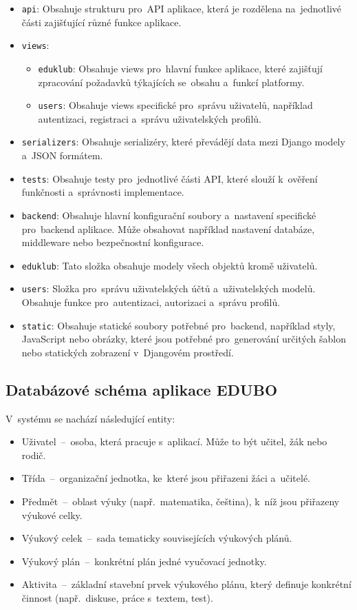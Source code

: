 \documentclass[male,czech,api_bc]{kitheses}
\begin{document}
\begin{itemize}
	\item \texttt{api}: Obsahuje strukturu pro~API aplikace, která je rozdělena na~jednotlivé části zajišťující různé funkce aplikace.
	\item \texttt{views}:
	\begin{itemize}
		\item \texttt{eduklub}: Obsahuje views pro~hlavní funkce aplikace, které zajišťují zpracování požadavků týkajících se~obsahu a~funkcí platformy.
		\item \texttt{users}: Obsahuje views specifické pro~správu uživatelů, například autentizaci, registraci a~správu uživatelských profilů.
	\end{itemize}
	\item \texttt{serializers}: Obsahuje serializéry, které převádějí data mezi Django modely a~JSON formátem.
	\item \texttt{tests}: Obsahuje testy pro~jednotlivé části API, které slouží k~ověření funkčnosti a~správnosti implementace.
	\item \texttt{backend}: Obsahuje hlavní konfigurační soubory a~nastavení specifické pro~backend aplikace. Může obsahovat například nastavení databáze, middleware nebo bezpečnostní konfigurace.
	\item \texttt{eduklub}: Tato složka obsahuje modely všech objektů kromě uživatelů.
	\item \texttt{users}: Složka pro~správu uživatelských účtů a~uživatelských modelů. Obsahuje funkce pro~autentizaci, autorizaci a~správu profilů.
	\item \texttt{static}: Obsahuje statické soubory potřebné pro~backend, například styly, JavaScript nebo obrázky, které jsou potřebné pro~generování určitých šablon nebo statických zobrazení v~Djangovém prostředí.
\end{itemize}

\subsection{Databázové schéma aplikace EDUBO}

V~systému se nachází následující entity:
\begin{itemize}
	\item Uživatel~--~osoba, která pracuje s~aplikací. Může to být učitel, žák nebo rodič.
	\item Třída~--~organizační jednotka, ke~které jsou přiřazeni žáci a~učitelé.
	\item Předmět~--~oblast výuky (např.~matematika, čeština), k~níž jsou přiřazeny výukové celky.
	\item Výukový celek~--~sada tematicky souvisejících výukových plánů.
	\item Výukový plán~--~konkrétní plán jedné vyučovací jednotky.
	\item Aktivita~--~základní stavební prvek výukového plánu, který definuje konkrétní činnost (např.~diskuse, práce s~textem, test).
\end{itemize}
\end{document}
